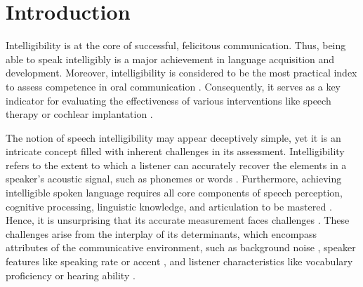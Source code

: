 \documentclass[
  authoryear,
  preprint,
  1p]{elsarticle}
\begin{document}
\newpage{}

\section{Introduction}\label{sec-introduction}

Intelligibility is at the core of successful, felicitous communication.
Thus, being able to speak intelligibly is a major achievement in
language acquisition and development. Moreover, intelligibility is
considered to be the most practical index to assess competence in oral
communication \citep{Kent_et_al_1994}. Consequently, it serves as a key
indicator for evaluating the effectiveness of various interventions like
speech therapy or cochlear implantation \citep{Chin_et_al_2012}.

The notion of speech intelligibility may appear deceptively simple, yet
it is an intricate concept filled with inherent challenges in its
assessment. Intelligibility refers to the extent to which a listener can
accurately recover the elements in a speaker's acoustic signal, such as
phonemes or words
\citep{Freeman_et_al_2017, vanHeuven_2008, Whitehill_et_al_2004}.
Furthermore, achieving intelligible spoken language requires all core
components of speech perception, cognitive processing, linguistic
knowledge, and articulation to be mastered \citep{Freeman_et_al_2017}.
Hence, it is unsurprising that its accurate measurement faces challenges
\citep{Kent_et_al_1989}. These challenges arise from the interplay of
its determinants, which encompass attributes of the communicative
environment, such as background noise \citep{Munro_1998}, speaker
features like speaking rate \citep{Munro_et_al_1998} or accent
\citep{Jenkins_2000, Ockey_et_al_2016}, and listener characteristics
like vocabulary proficiency or hearing ability
\citep{Varonis_et_al_1985}.
\end{document}
